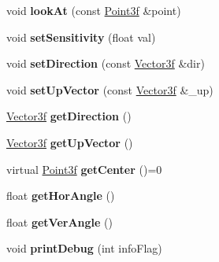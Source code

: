 \begin{DoxyCompactItemize}
\item 
\hypertarget{class_movable_a00ff501e6ee6cf56f901d2b5fde88089}{void {\bfseries look\-At} (const \hyperlink{struct_point3f}{Point3f} \&point)}\label{class_movable_a00ff501e6ee6cf56f901d2b5fde88089}

\item 
\hypertarget{class_movable_a306c3ad33776907bce67e5b45dd1231a}{void {\bfseries set\-Sensitivity} (float val)}\label{class_movable_a306c3ad33776907bce67e5b45dd1231a}

\item 
\hypertarget{class_movable_a68817fb10935bc88e0648cddcb5929cd}{void {\bfseries set\-Direction} (const \hyperlink{struct_vector3f}{Vector3f} \&dir)}\label{class_movable_a68817fb10935bc88e0648cddcb5929cd}

\item 
\hypertarget{class_movable_a8deb4d6efac9f5f687371f753a4c1a7b}{void {\bfseries set\-Up\-Vector} (const \hyperlink{struct_vector3f}{Vector3f} \&\-\_\-up)}\label{class_movable_a8deb4d6efac9f5f687371f753a4c1a7b}

\item 
\hypertarget{class_movable_a3c95d0459d29b61fb7df18c4c3f755e7}{\hyperlink{struct_vector3f}{Vector3f} {\bfseries get\-Direction} ()}\label{class_movable_a3c95d0459d29b61fb7df18c4c3f755e7}

\item 
\hypertarget{class_movable_a5e46e4c01d01874485716a47024aa566}{\hyperlink{struct_vector3f}{Vector3f} {\bfseries get\-Up\-Vector} ()}\label{class_movable_a5e46e4c01d01874485716a47024aa566}

\item 
\hypertarget{class_movable_a25fe8383bfdc607680bace38702a0366}{virtual \hyperlink{struct_point3f}{Point3f} {\bfseries get\-Center} ()=0}\label{class_movable_a25fe8383bfdc607680bace38702a0366}

\item 
\hypertarget{class_movable_a1625bfd464ef8ec343a5c11faa5a0127}{float {\bfseries get\-Hor\-Angle} ()}\label{class_movable_a1625bfd464ef8ec343a5c11faa5a0127}

\item 
\hypertarget{class_movable_adb16b44885ab66be22faf6b61b6c5237}{float {\bfseries get\-Ver\-Angle} ()}\label{class_movable_adb16b44885ab66be22faf6b61b6c5237}

\item 
\hypertarget{class_movable_a079d42b3d1ddabfcaf2bbc4cec496bf7}{void {\bfseries print\-Debug} (int info\-Flag)}\label{class_movable_a079d42b3d1ddabfcaf2bbc4cec496bf7}

\end{DoxyCompactItemize}
